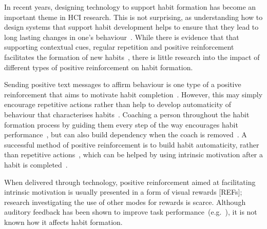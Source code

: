 \documentclass{scaffold/sigchi}
\begin{document}
In recent years, designing technology to support habit formation has become an important theme in HCI research. This is not surprising, as understanding how to design systems that support habit development helps to ensure that they lead to long lasting changes in one's behaviour~\cite{how_to_evaluate_tech_for_behaviour_change}. While there is evidence that that supporting contextual cues, regular repetition and positive reinforcement facilitates the formation of new habits~\cite{article_beyond_self_tracking_designing_apps}, there is little research into the impact of different types of positive reinforcement on habit formation.



Sending positive text messages to affirm behaviour is one type of a positive reinforcement that aims to motivate habit completion~\cite{chi_crowd_designed_motivation}. However, this may simply encourage repetitive actions rather than help to develop automaticity of behaviour that characterises habits~\cite{habits_as_automaticity_not_frequency_gardner}. Coaching a person throughout the habit formation process by guiding them every step of the way encourages habit performance~\cite{coaching_not_that_good}, but can also build dependency when the coach is removed~\cite{article_dont_kick_habit, article_realtime_feedback_improving_medication_taking}. A successful method of positive reinforcement is to build habit automaticity, rather than repetitive actions~\cite{article_beyond_self_tracking_designing_apps}, which can be helped by using intrinsic motivation after a habit is completed~\cite{article_a_self_efficacy, article_meta_analytic_review_intrinsic_motivation}.

When delivered through technology, positive reinforcement aimed at facilitating intrinsic motivation is usually presented in a form of visual rewards [REFs]; research investigating the use of other modes for rewards is scarce. Although auditory feedback has been shown to improve task performance~(e.g.~\cite{burke2006comparing, vazquez2012auditory, chi_oussama_tap_the_shapetones}), it is not known how it affects habit formation.
\end{document}
